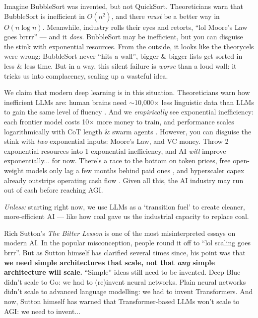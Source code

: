 \documentclass[11pt]{article}
\begin{document}
Imagine BubbleSort was invented, but not QuickSort. Theoreticians warn that BubbleSort is inefficient in $O(n^2)$, and there \textit{must} be a better way in $O(n \log n)$. Meanwhile, industry rolls their eyes and retorts, ``lol Moore's Law goes brrrr'' — and it \textit{does}. BubbleSort may be inefficient, but you can disguise the stink with exponential resources. From the outside, it looks like the theorycels were wrong: BubbleSort never ``hits a wall'', bigger \& bigger lists get sorted in less \& less time. But in a way, this silent failure is \textit{worse} than a loud wall: it tricks us into complacency, scaling up a wasteful idea.

We claim that modern deep learning is in this situation. Theoreticians warn how inefficient LLMs are: human brains need $\sim$10,000$\times$ less linguistic data than LLMs to gain the same level of fluency \citep{frank_data_gap}. And we \textit{empirically} see exponential inefficiency: each frontier model costs 10$\times$ more money to train, and performance scales logarithmically with CoT length \& swarm agents \citep{ord_scaling_paradox,ord_log_x_chart,ord_swarm_scaling}. However, you can disguise the stink with \textit{two} exponential inputs: Moore's Law, and VC money. Throw 2 exponential resources into 1 exponential inefficiency, and AI \textit{will} improve exponentially... for now. There's a race to the bottom on token prices, free open-weight models only lag a few months behind paid ones \citep{epoch_open_closed_gap}, and hyperscaler capex already outstrips operating cash flow \citep{tikr_capex_gap}. Given all this, the AI industry may run out of cash before reaching AGI.

\textit{Unless:} starting right now, we use LLMs as a `transition fuel' to create cleaner, more-efficient AI — like how coal gave us the industrial capacity to replace coal.

Rich Sutton's \textit{The Bitter Lesson} \citep{bitter_lesson} is one of the most misinterpreted essays on modern AI. In the popular misconception, people round it off to ``lol scaling goes brrr''. But as Sutton himself has clarified several times since, his point was that \textbf{we need simple architectures that scale, not that \textit{any} simple architecture will scale.} ``Simple'' ideas still need to be invented. Deep Blue didn't scale to Go: we had to (re)invent neural networks. Plain neural networks didn't scale to advanced language modelling: we had to invent Transformers. And now, Sutton \citep{sutton_dwarkesh} himself has warned that Transformer-based LLMs won't scale to AGI: we need to invent...
\end{document}
